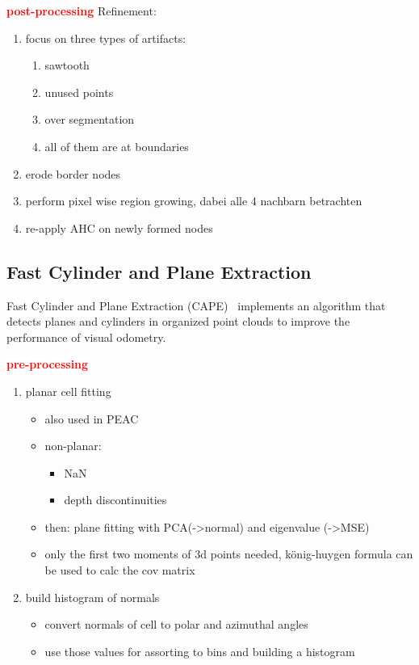 \documentclass[main.tex]{subfiles}
\begin{document}
\textbf{\textcolor{red}{post-processing}}
Refinement:
\begin{enumerate}
    \item focus on three types of artifacts:
    \begin{enumerate}
        \item sawtooth
        \item unused points
        \item over segmentation
        \item all of them are at boundaries
    \end{enumerate}
    \item erode border nodes
    \item perform pixel wise region growing, dabei alle 4 nachbarn betrachten
    \item re-apply AHC on newly formed nodes
\end{enumerate}

\subsection{Fast Cylinder and Plane Extraction}
Fast Cylinder and Plane Extraction (CAPE)~\cite{Proença_Gao_2018} implements an algorithm that detects planes and cylinders in organized point clouds to improve the performance
of visual odometry. 

\textbf{\textcolor{red}{pre-processing}}
\begin{enumerate}
    \item planar cell fitting
    \begin{itemize}
        \item also used in PEAC
        \item non-planar: 
        \begin{itemize}
            \item NaN
            \item depth discontinuities
        \end{itemize}
        \item then: plane fitting with PCA(->normal) and eigenvalue (->MSE)
        \item only the first two moments of 3d points needed, könig-huygen formula can be used to calc the cov matrix
    \end{itemize}
    \item build histogram of normals
    \begin{itemize}
        \item convert normals of cell to polar and azimuthal angles
        \item use those values for assorting to bins and building a histogram
    \end{itemize}
\end{enumerate}
\end{document}
